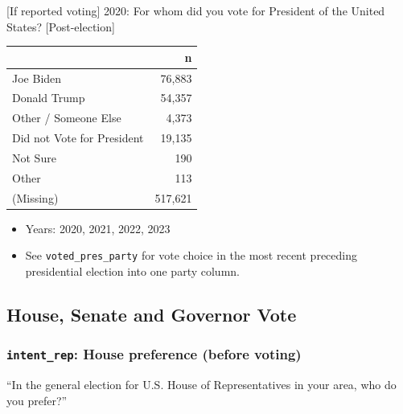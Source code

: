 \documentclass[10pt,article,oneside]{memoir}
\theoremstyle{definition}
\begin{document}
{[}If reported voting{]} 2020: For whom did you vote for President of
the United States? {[}Post-election{]}

\begin{table}[H]
\centering
\begin{tabular}[t]{lr}
\toprule
 & n\\
\midrule
Joe Biden & 76,883\\
Donald Trump & 54,357\\
Other / Someone Else & 4,373\\
Did not Vote for President & 19,135\\
Not Sure & 190\\
Other & 113\\
(Missing) & 517,621\\
\bottomrule
\end{tabular}
\end{table}

\begin{itemize}
\tightlist
\item
  Years: 2020, 2021, 2022, 2023
\item
  See \texttt{voted\_pres\_party} for vote choice in the most recent
  preceding presidential election into one party column.
\end{itemize}

\subsection{House, Senate and Governor
Vote}\label{house-senate-and-governor-vote}

\subsubsection{\texorpdfstring{\texttt{intent\_rep}: House preference
(before
voting)}{intent\_rep: House preference (before voting)}}\label{intent_rep-house-preference-before-voting}

``In the general election for U.S. House of Representatives in your
area, who do you prefer?''
\end{document}
